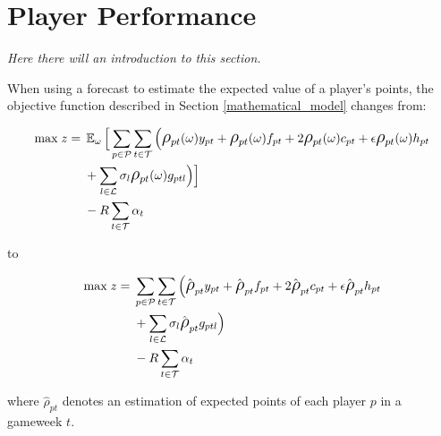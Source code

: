 \newpage 

\section{Player Performance} \label{Player_Performance}

\textit{Here there will an introduction to this section.}

When using a forecast to estimate the expected value of a player's points, the objective function described in Section \ref{mathematical_model} changes from: 

\begin{equation*}
\smaller
\begin{aligned}
\text{max} \; z ={} & \EX_{\omega} \Big\lbrack\sum\limits_{p \in \mathcal{P}} \sum\limits_{t \in \mathcal{T}} \Big( \mathlarger{\rho}_{pt}(\omega)y_{pt} + \mathlarger{\rho}_{pt}(\omega)f_{pt} + 2 \mathlarger{\rho}_{pt}(\omega)c_{pt} + \epsilon  \mathlarger{\rho}_{pt}(\omega)h_{pt} \\ 
& + \sum_{l \in \mathcal{L}}\sigma_{l} \mathlarger{\rho}_{pt}(\omega)g_{ptl} \Big)  \Big\rbrack \\ 
& - R\sum_{t \in \mathcal{T}}\alpha_{t}
\end{aligned}
\end{equation*}

to 

\begin{equation*}
\smaller
\begin{aligned}
\text{max} \; z ={} &  \sum\limits_{p \in \mathcal{P}} \sum\limits_{t \in \mathcal{T}} \Big( \hat{\mathlarger{\rho}}_{pt} y_{pt} + \hat{\mathlarger{\rho}}_{pt} f_{pt} + 2 \hat{\mathlarger{\rho}}_{pt} c_{pt} + \epsilon  \hat{\mathlarger{\rho}}_{pt} h_{pt} \\ 
& + \sum_{l \in \mathcal{L}}\sigma_{l} \hat{\mathlarger{\rho}}_{pt} g_{ptl} \Big)  \\ 
& - R\sum_{t \in \mathcal{T}}\alpha_{t}
\end{aligned}
\end{equation*}


where $\hat{\rho}_{pt}$ denotes an estimation of expected points of each player $p$ in a gameweek $t$.

